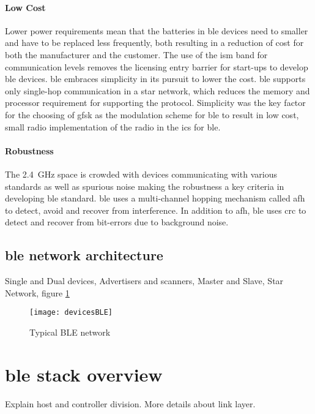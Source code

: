 \paragraph{Low Cost} Lower power requirements mean that the batteries in \gls{ble} devices need to smaller and have to be replaced less frequently, both resulting in a reduction of cost for both the manufacturer and the customer. The use of the \gls{ism} band for communication levels removes the licensing entry barrier for start-ups to develop \gls{ble} devices. \gls{ble} embraces simplicity in its pursuit to lower the cost. \gls{ble} supports only single-hop communication in a star network, which reduces the memory and processor requirement for supporting the protocol. Simplicity was the key factor for the choosing of \gls{gfsk} as the modulation scheme for \gls{ble} to result in low cost, small radio implementation of the radio in the \glspl{ic} for \gls{ble}. 
\paragraph{Robustness} The 2.4~\si{\GHz} space is crowded with devices communicating with various standards as well as spurious noise making the robustness a key criteria in developing \gls{ble} standard. \gls{ble} uses a multi-channel hopping mechanism called \gls{afh} to detect, avoid and recover from interference. In addition to \gls{afh}, \gls{ble} uses \gls{crc} to detect and recover from bit-errors due to background noise.

\subsection{\gls{ble} network architecture}
Single and Dual devices,
Advertisers and scanners,
Master and Slave,
Star Network,
figure \ref{devicesBLE}
\begin{figure}[h] %
  \begin{center}
	\texttt{[image: devicesBLE]}
  \end{center}
\caption{Typical BLE network}
\label{devicesBLE}
\end{figure}

\section{\gls{ble} stack overview}
Explain host and controller division. More details about link layer.

